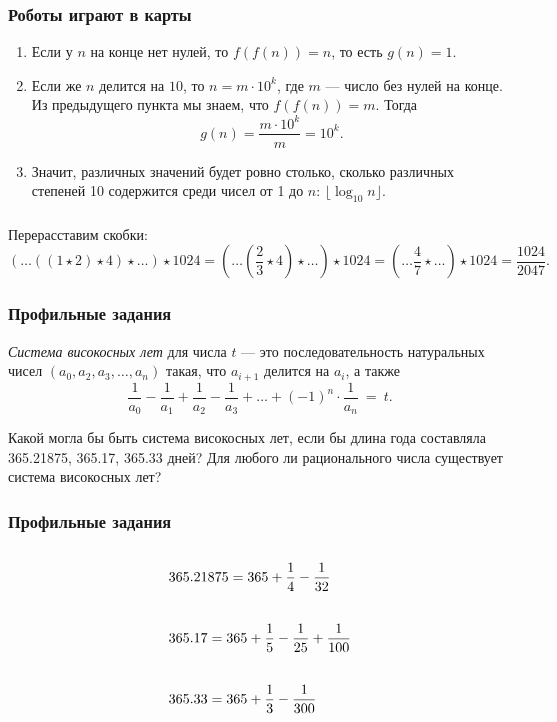 \documentclass[aspectratio=1610,12pt,notheorems]{beamer}
\begin{document}
\begin{frame}\frametitle{Роботы играют в карты}
\begin{enumerate}
	\item Если у $n$ на конце нет нулей, то $f\left(f(n)\right) = n$, то есть $g(n) = 1$. \pause
	\item Если же $n$ делится на $10$, то $n = m\cdot10^k$, где $m$ --- число без нулей на конце. Из предыдущего пункта мы знаем, что $f\left(f(n)\right) = m$. Тогда $$g(n) = \frac{ m\cdot10^k}{m} = 10^k.$$ \pause
	\item Значит, различных значений будет ровно столько, сколько различных степеней 10 содержится среди чисел от 1 до $n$: $\lfloor \log_{10}n \rfloor$.
\end{enumerate}
\end{frame}

\begin{frame}\frametitle{}
Перерасставим скобки: $$(\ldots((1\star2)\star4)\star\ldots)\star1024 = \left(\ldots\left(\frac{2}{3}\star4\right)\star\ldots\right)\star1024 = \left(\ldots\frac{4}{7}\star\ldots\right)\star1024 = \frac{1024}{2047}.$$
\end{frame}

\begin{frame} \frametitle{Профильные задания}
{\it Система високосных лет} для числа $t$ — это последовательность натуральных чисел $(a_0, a_2, a_3, \ldots, a_n)$ такая, что $a_{i+1}$ делится на $a_i$, а также
	$$\frac{1}{a_0} - \frac{1}{a_1} + \frac{1}{a_2} - \frac{1}{a_3} + \ldots
	     + (-1)^{n} \cdot \frac{1}{a_n}\ =\ t.$$ \smallskip

Какой могла бы быть система високосных лет, если бы длина года составляла 365.21875, 365.17, 365.33 дней? Для любого ли рационального числа существует система високосных лет?
\end{frame}

\begin{frame} \frametitle{Профильные задания}

\begin{align*}
	& 365.21875 = 365 + \frac{1}{4} - \frac{1}{32}
		\vphantom{\int\limits_{0_0}^{0^0}} \\
	& 365.17 = 365 + \frac{1}{5} - \frac{1}{25} + \frac{1}{100}
		\vphantom{\int\limits_{0_0}^{0^0}} \\
	& 365.33 = 365 + \frac{1}{3} - \frac{1}{300}
		\vphantom{\int\limits_{0_0}^{0^0}} \\
\end{align*}

\end{frame}
\end{document}
